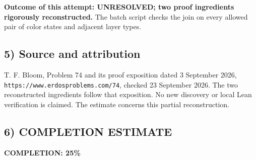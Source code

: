\textbf{Outcome of this attempt: UNRESOLVED; two proof ingredients
rigorously reconstructed.} The batch script checks the join on every
allowed pair of color states and adjacent layer types.

\subsection{5) Source and attribution}
T. F. Bloom, Problem 74 and its proof exposition dated 3 September
2026, \texttt{https://www.erdosproblems.com/74}, checked
23 September 2026. The two reconstructed ingredients follow that
exposition. No new discovery or local Lean verification is claimed.
The estimate concerns this partial reconstruction.
\subsection{6) COMPLETION ESTIMATE}
\textbf{COMPLETION: 25\%}
